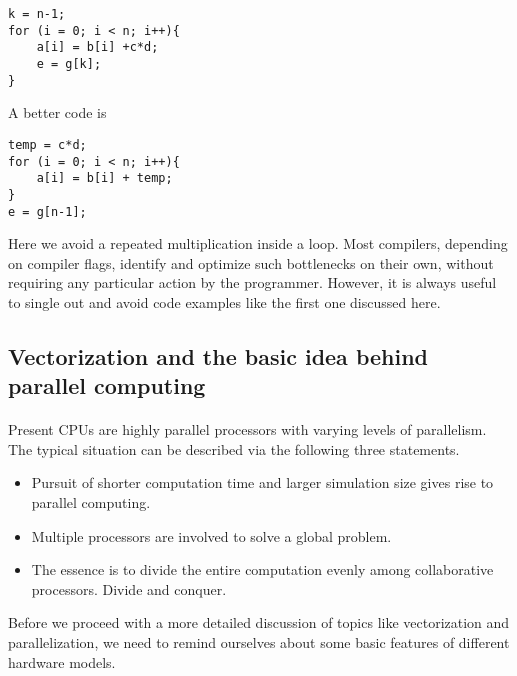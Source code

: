 \begin{verbatim}
k = n-1;
for (i = 0; i < n; i++){
    a[i] = b[i] +c*d;
    e = g[k];
}

\end{verbatim}

A better code is






\begin{verbatim}
temp = c*d;
for (i = 0; i < n; i++){
    a[i] = b[i] + temp;
}
e = g[n-1];

\end{verbatim}

Here we avoid a repeated multiplication inside a loop. 
Most compilers, depending on compiler flags, identify and optimize such bottlenecks on their own, without requiring any particular action by the programmer. However, it is always useful to single out and avoid code examples like the first one discussed here.



\subsection*{Vectorization and the basic idea behind parallel computing}

\paragraph{}
Present CPUs are highly parallel processors with varying levels of parallelism. The typical situation can be described via the following three statements.
\begin{itemize}
\item Pursuit of shorter computation time and larger simulation size gives rise to parallel computing.

\item Multiple processors are involved to solve a global problem.

\item The essence is to divide the entire computation evenly among collaborative processors.  Divide and conquer.
\end{itemize}

\noindent
Before we proceed with a more detailed discussion of topics like vectorization and parallelization, we need to remind ourselves about some basic features of different hardware models.




